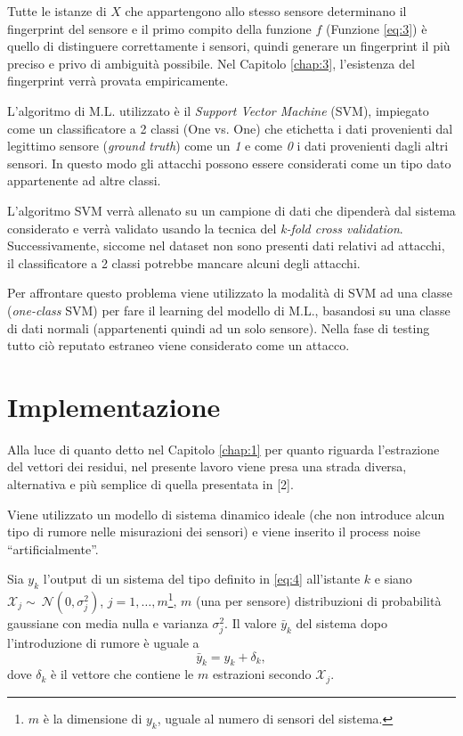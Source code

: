 \documentclass[Lau,binding=0.6cm]{sapthesis}
\begin{document}
Tutte le istanze di $X$ che appartengono allo stesso sensore determinano il fingerprint del sensore e il primo compito della funzione $f$ (Funzione \ref{eq:3}) \`e quello di distinguere correttamente i sensori, 
quindi generare un fingerprint il pi\`u preciso e privo di ambiguit\`a possibile. Nel Capitolo \ref{chap:3}, l'esistenza del fingerprint verr\`a provata empiricamente.

L'algoritmo di M.L. utilizzato \`e il \textit{Support Vector Machine} (SVM), impiegato come un classificatore a 2 classi (One vs. One) che etichetta i dati provenienti dal legittimo sensore (\textit{ground truth}) come un \textit{1}
e come \textit{0} i dati provenienti dagli altri sensori. In questo modo gli attacchi possono essere considerati come un tipo dato appartenente ad altre classi.

L'algoritmo SVM verr\`a allenato su un campione di dati che dipender\`a dal sistema considerato e verr\`a validato usando la tecnica del \textit{k-fold cross validation}.
Successivamente, siccome nel dataset non sono presenti dati relativi ad attacchi, il classificatore a 2 classi potrebbe mancare alcuni degli attacchi.

Per affrontare questo problema viene utilizzato la modalit\`a di SVM ad una classe (\textit{one-class} SVM) per fare il learning del modello di M.L., basandosi su una classe di dati normali (appartenenti quindi ad un solo sensore). 
Nella fase di testing tutto ci\`o reputato estraneo viene considerato come un attacco.


\chapter{Implementazione}
Alla luce di quanto detto nel Capitolo \ref{chap:1} per quanto riguarda l'estrazione del vettori dei residui, nel presente lavoro viene presa una strada diversa, alternativa e pi\`u semplice di quella presentata in [2].

Viene utilizzato un modello di sistema dinamico ideale (che non introduce alcun tipo di rumore nelle misurazioni dei sensori) e viene inserito il process noise ``artificialmente''.

Sia $y_k$ l'output di un sistema del tipo definito in \ref{eq:4} all'istante $k$ e siano $\mathcal{X}_j \sim~\mathcal{N}(0,\sigma_j^2)$, $j = 1,\ldots,m$\footnote{{$m$ \`e la dimensione di $y_k$, uguale al numero di sensori del sistema.}}, $m$ (una per sensore) distribuzioni di probabilit\`a gaussiane con media nulla e varianza $\sigma_j^2$.
Il valore $\bar{y}_k$ del sistema dopo l'introduzione di rumore \`e uguale a
\begin{equation}
    \bar{y}_k = y_k + \delta_k\label{eq:6},
\end{equation}
dove $\delta_k$ \`e il vettore che contiene le $m$ estrazioni secondo $\mathcal{X}_j$.
\end{document}

